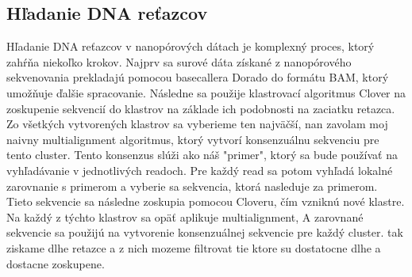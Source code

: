 \subsection{Hľadanie DNA reťazcov}
Hľadanie DNA reťazcov v nanopórových dátach je komplexný proces, ktorý zahŕňa niekoľko krokov. Najprv sa surové dáta získané z nanopórového sekvenovania prekladajú pomocou basecallera Dorado do formátu BAM, ktorý umožňuje ďalšie spracovanie. Následne sa použije klastrovací algoritmus Clover na zoskupenie sekvencií do klastrov na základe ich podobnosti na zaciatku retazca.
Zo všetkých vytvorených klastrov sa vyberieme ten najväčší, nan zavolam moj naivny multialignment algoritmus, ktorý vytvorí konsenzuálnu sekvenciu pre tento cluster. Tento konsenzus slúži ako náš "primer", ktorý sa bude používať na vyhľadávanie v jednotlivých readoch.
Pre každý read sa potom vyhľadá lokalné zarovnanie s primerom a vyberie sa sekvencia, ktorá nasleduje za primerom. 
Tieto sekvencie sa následne zoskupia pomocou Cloveru, čím vzniknú nové klastre.
Na každý z týchto klastrov sa opäť aplikuje multialignment, A zarovnané sekvencie sa použijú na vytvorenie konsenzuálnej sekvencie pre každý cluster.
tak ziskame dlhe retazce a z nich mozeme filtrovat tie ktore su dostatocne dlhe a dostacne zoskupene.

